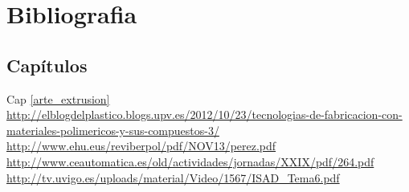 \chapter{Bibliografia}
\label{bibliografia}
\section{Capítulos}
Cap \ref{arte_extrusion}\\
\url{http://elblogdelplastico.blogs.upv.es/2012/10/23/tecnologias-de-fabricacion-con-materiales-polimericos-y-sus-compuestos-3/}\\
\url{http://www.ehu.eus/reviberpol/pdf/NOV13/perez.pdf}\\

\url{http://www.ceautomatica.es/old/actividades/jornadas/XXIX/pdf/264.pdf}\\
\url{http://tv.uvigo.es/uploads/material/Video/1567/ISAD_Tema6.pdf}\\
